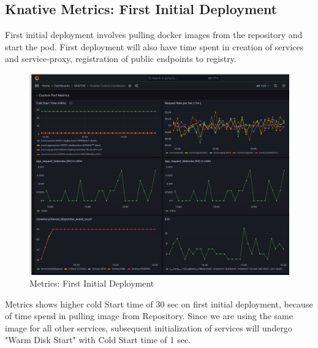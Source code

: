\documentclass{article}
\begin{document}
\begin{flushleft}
\subsection{Knative Metrics: First Initial Deployment}
First initial deployment involves pulling docker images from the repository and start the pod. First deployment will also have time spent in creation of services and service-proxy, registration of public endpoints to registry.

\begin{figure}[h]
    \centering
    \includegraphics[scale=0.5]{images/Grafana/Grafana_Cold_Start_FirstDeployment.PNG}
    \caption{Metrics: First Initial Deployment}
    \label{grafana_first_initial_deployment}
\end{figure}
\par
Metrics shows higher cold Start time of 30 sec on first initial deployment, because of time spend in pulling image from Repository. Since we are using the same image for all other services, subsequent initialization of services will undergo "Warm Disk Start" with Cold Start time of 1 sec.

\end{flushleft}
\end{document}
